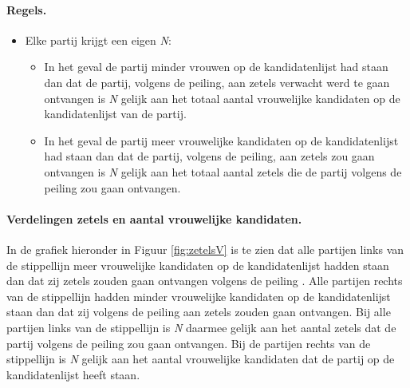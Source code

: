 \paragraph{Regels.}
\begin{itemize}

 		\item
Elke partij krijgt een eigen \textit{N}:
 
		\begin{itemize}
			\item
In het geval de partij minder vrouwen op de kandidatenlijst had staan dan dat de partij, volgens de peiling, aan zetels verwacht werd te gaan ontvangen is \textit{N} gelijk aan het totaal aantal vrouwelijke kandidaten op de kandidatenlijst van de partij.
			\item
In het geval de partij meer vrouwelijke kandidaten op de kandidatenlijst had staan dan dat de partij, volgens de peiling, aan zetels zou gaan ontvangen is \textit{N} gelijk aan het totaal aantal zetels die de partij volgens de peiling zou gaan ontvangen.\\	
			
		\end{itemize} 	
\end{itemize} 

\paragraph{Verdelingen zetels en aantal vrouwelijke kandidaten.}
In de grafiek hieronder in Figuur \ref{fig:zetelsV} is te zien dat alle partijen links van de stippellijn meer vrouwelijke kandidaten op de kandidatenlijst \citep{Kiesraad_kandidatenlijsten} hadden staan dan dat zij zetels zouden gaan ontvangen volgens de peiling \citep{IPSOS}. Alle partijen rechts van de stippellijn hadden minder vrouwelijke kandidaten op de kandidatenlijst staan dan dat zij volgens de peiling aan zetels zouden gaan ontvangen. Bij alle partijen links van de stippellijn is \textit{N} daarmee gelijk aan het aantal zetels dat de partij volgens de peiling zou gaan ontvangen. Bij de partijen rechts van de stippellijn is \textit{N} gelijk aan het aantal vrouwelijke kandidaten dat de partij op de kandidatenlijst heeft staan.
 
